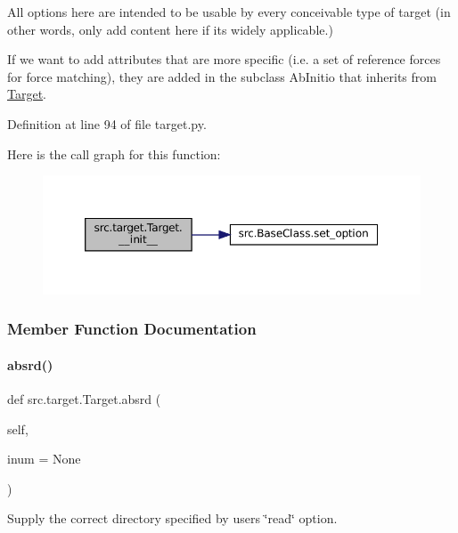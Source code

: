All options here are intended to be usable by every conceivable type of target (in other words, only add content here if it\textquotesingle{}s widely applicable.) 

If we want to add attributes that are more specific (i.\+e. a set of reference forces for force matching), they are added in the subclass Ab\+Initio that inherits from \hyperlink{classsrc_1_1target_1_1Target}{Target}. 

Definition at line 94 of file target.\+py.

Here is the call graph for this function\+:
\nopagebreak
\begin{figure}[H]
\begin{center}
\leavevmode
\includegraphics[width=350pt]{classsrc_1_1target_1_1Target_ad813da97ae8fc89665a12c35145cdde6_cgraph}
\end{center}
\end{figure}


\subsubsection{Member Function Documentation}
\mbox{\label{classsrc_1_1target_1_1Target_ad4a6e0bee35444a8b2c8bc124aac3c46}} 
\paragraph{\texorpdfstring{absrd()}{absrd()}}
{\footnotesize\ttfamily def src.\+target.\+Target.\+absrd (\begin{DoxyParamCaption}\item[{}]{self,  }\item[{}]{inum = {\ttfamily None} }\end{DoxyParamCaption})}



Supply the correct directory specified by user\textquotesingle{}s \char`\"{}read\char`\"{} option. 



